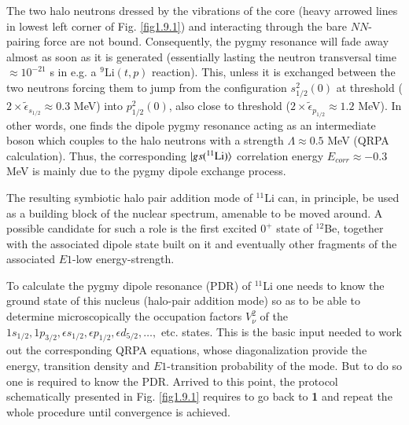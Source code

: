 The two halo neutrons dressed by the vibrations of the core (heavy arrowed lines in lowest left corner of Fig. \ref{fig1.9.1}) and interacting through the bare $NN$-pairing force are not bound. Consequently, the pygmy resonance will fade away almost as soon as it is generated (essentially lasting the neutron transversal time $\approx 10^{-21}$ s in e.g. a $^9$Li$(t,p)$ reaction). This, unless it is exchanged between the two neutrons forcing them to jump from the configuration $s^{2}_{1/2}(0)$ at threshold ($2\times\tilde\epsilon_{s_{1/2}}\approx 0.3$ MeV) into  $p^2_{1/2}(0)$, also close to threshold     ($2\times\tilde\epsilon_{p_{1/2}}\approx 1.2$ MeV). In other words, one finds the dipole pygmy resonance acting as an intermediate boson which  couples to the halo neutrons with a  strength $\Lambda\approx 0.5$ MeV (QRPA calculation). Thus, the corresponding $|{gs(^{11}\text{Li})} \rangle$ correlation energy $E_{corr}\approx-0.3$ MeV is mainly due to the  pygmy dipole exchange process.


 The resulting symbiotic halo pair addition mode of $^{11}$Li can, in principle, be used as a building block of the nuclear spectrum, amenable to  be moved around. A possible candidate for such a role is the first excited $0^+$ state of $^{12}$Be, together with the associated dipole state built on it and eventually other fragments of the associated $E1$-low energy-strength.


 To calculate the pygmy dipole  resonance (PDR) of $^{11}$Li one needs to know the ground state of this nucleus (halo-pair addition mode) so as to be able to determine microscopically the occupation factors $V_\nu^2$ of the $1s_{1/2},1p_{3/2},\epsilon s_{1/2},\epsilon p_{1/2},\epsilon d_{5/2},\dots,$ etc. states.  This is the basic input needed to work out the corresponding QRPA equations, whose diagonalization provide the energy, transition density and $E1$-transition probability of the mode. But to do so one is required to know the PDR. Arrived to this point, the protocol schematically presented in Fig. \ref{fig1.9.1}  requires to  go back to \textbf{1} and repeat the whole procedure until   convergence is achieved. 

